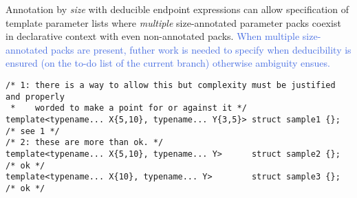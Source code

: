 \p Annotation by \textit{size} with deducible endpoint expressions can allow specification of template parameter lists where \textit{multiple} size-annotated parameter packs coexist in declarative context with even non-annotated packs.
\textcolor{RoyalBlue}{When multiple size-annotated packs are present, futher work is needed to specify when deducibility is ensured (on the to-do list of the current branch) otherwise ambiguity ensues.}

\begin{verbatim}
/* 1: there is a way to allow this but complexity must be justified and properly
 *    worded to make a point for or against it */
template<typename... X{5,10}, typename... Y{3,5}> struct sample1 {}; /* see 1 */
/* 2: these are more than ok. */
template<typename... X{5,10}, typename... Y>      struct sample2 {}; /* ok */
template<typename... X{10}, typename... Y>        struct sample3 {}; /* ok */
\end{verbatim}
